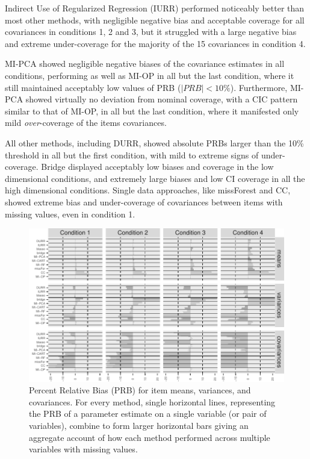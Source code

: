 	Indirect Use of Regularized Regression (IURR) performed noticeably better than most other methods, 
	with negligible negative bias and acceptable coverage for all covariances in conditions 1, 2 and 3, 
	but it struggled with a large negative bias and extreme under-coverage for the majority of the 15 
	covariances in condition 4.
	
	MI-PCA showed negligible negative biases of the covariance estimates in all conditions, performing as 
	well as MI-OP in all but the last condition, where it still maintained acceptably low values of PRB 
	($|PRB| < 10\%$).
	Furthermore, MI-PCA showed virtually no deviation from nominal coverage, with a CIC pattern similar to 
	that of MI-OP, in all but the last condition, where it manifested only mild \emph{over}-coverage of the 
	items covariances.

	All other methods, including DURR, showed absolute PRBs larger than the 10\% threshold in all but the 
	first condition, with mild to extreme signs of under-coverage.
	Bridge displayed acceptably low biases and coverage in the low dimensional conditions, and 
	extremely large biases and low CI coverage in all the high dimensional conditions.
	Single data approaches, like missForest and CC, showed extreme bias and under-coverage of covariances between 
	items with missing values, even in condition 1.
	

\begin{figure}[p]
	\includegraphics{../../output/graphs/exp1_bias.pdf}
\caption{
	Percent Relative Bias (PRB) for item means, variances, and covariances.
	For every method, single horizontal lines, representing the PRB of a parameter estimate on 
	a single variable (or pair of variables), combine to form larger horizontal bars giving an 
	aggregate account of how each method performed across multiple variables with missing values.
	}
\label{fig:exp1bias}
\end{figure}

